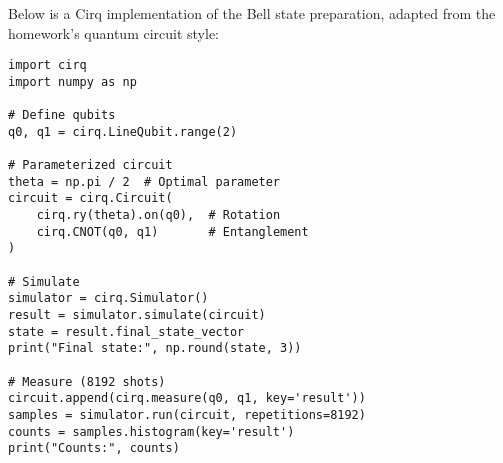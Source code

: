 

Below is a Cirq implementation of the Bell state preparation, adapted from
the homework’s quantum circuit style:

\begin{verbatim}
import cirq
import numpy as np

# Define qubits
q0, q1 = cirq.LineQubit.range(2)

# Parameterized circuit
theta = np.pi / 2  # Optimal parameter
circuit = cirq.Circuit(
    cirq.ry(theta).on(q0),  # Rotation
    cirq.CNOT(q0, q1)       # Entanglement
)

# Simulate
simulator = cirq.Simulator()
result = simulator.simulate(circuit)
state = result.final_state_vector
print("Final state:", np.round(state, 3))

# Measure (8192 shots)
circuit.append(cirq.measure(q0, q1, key='result'))
samples = simulator.run(circuit, repetitions=8192)
counts = samples.histogram(key='result')
print("Counts:", counts)
\end{verbatim}

